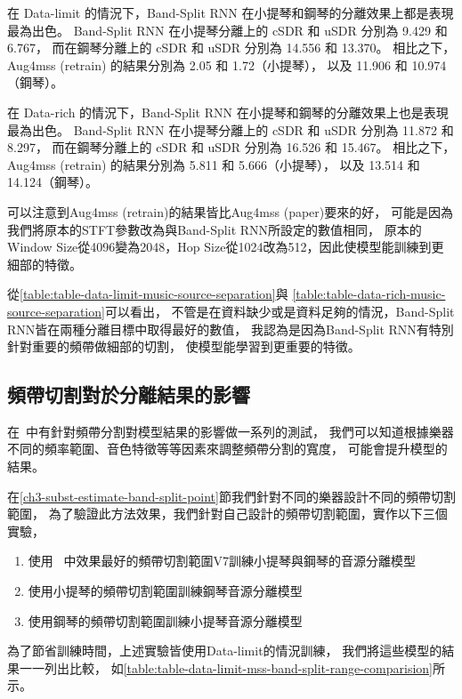 \documentclass[class=NCU_thesis, crop=false]{standalone}
\begin{document}
在 Data-limit 的情況下，Band-Split RNN 在小提琴和鋼琴的分離效果上都是表現最為出色。
Band-Split RNN 在小提琴分離上的 cSDR 和 uSDR 分別為 9.429 和 6.767，
而在鋼琴分離上的 cSDR 和 uSDR 分別為 14.556 和 13.370。
相比之下，Aug4mss (retrain) 的結果分別為 2.05 和 1.72（小提琴），
以及 11.906 和 10.974（鋼琴）。

在 Data-rich 的情況下，Band-Split RNN 在小提琴和鋼琴的分離效果上也是表現最為出色。
Band-Split RNN 在小提琴分離上的 cSDR 和 uSDR 分別為 11.872 和 8.297，
而在鋼琴分離上的 cSDR 和 uSDR 分別為 16.526 和 15.467。
相比之下，Aug4mss (retrain) 的結果分別為 5.811 和 5.666（小提琴），
以及 13.514 和 14.124（鋼琴）。

可以注意到Aug4mss (retrain)的結果皆比Aug4mss (paper)要來的好，
可能是因為我們將原本的STFT參數改為與Band-Split RNN所設定的數值相同，
原本的Window Size從4096變為2048，Hop Size從1024改為512，因此使模型能訓練到更細部的特徵。

從\cref{table:table-data-limit-music-source-separation}與
\cref{table:table-data-rich-music-source-separation}可以看出，
不管是在資料缺少或是資料足夠的情況，Band-Split RNN皆在兩種分離目標中取得最好的數值，
我認為是因為Band-Split RNN有特別針對重要的頻帶做細部的切割，
使模型能學習到更重要的特徵。

\subsection{頻帶切割對於分離結果的影響}

在~\cite{Luo_Yi2022MusicSourceSeparation}中有針對頻帶分割對模型結果的影響做一系列的測試，
我們可以知道根據樂器不同的頻率範圍、音色特徵等等因素來調整頻帶分割的寬度，
可能會提升模型的結果。

在\ref{ch3-subst-estimate-band-split-point}節我們針對不同的樂器設計不同的頻帶切割範圍，
為了驗證此方法效果，我們針對自己設計的頻帶切割範圍，實作以下三個實驗，
\begin{enumerate}
    \item 使用~\cite{Luo_Yi2022MusicSourceSeparation}
    中效果最好的頻帶切割範圍V7訓練小提琴與鋼琴的音源分離模型
    \item 使用小提琴的頻帶切割範圍訓練鋼琴音源分離模型
    \item 使用鋼琴的頻帶切割範圍訓練小提琴音源分離模型
\end{enumerate}
為了節省訓練時間，上述實驗皆使用Data-limit的情況訓練，
我們將這些模型的結果一一列出比較，
如\cref{table:table-data-limit-mss-band-split-range-comparision}所示。
\end{document}
